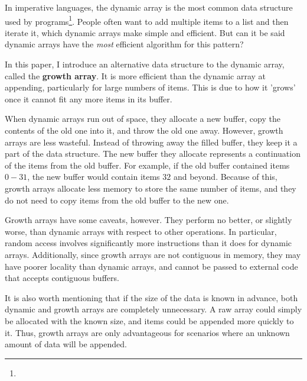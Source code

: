 In imperative languages, the dynamic array is the most common data structure used by programs\footnote{}. People often want to add multiple items to a list and then iterate it, which dynamic arrays make simple and efficient. But can it be said dynamic arrays have the \textit{most} efficient algorithm for this pattern?

In this paper, I introduce an alternative data structure to the dynamic array, called the \textbf{growth array}. It is more efficient than the dynamic array at appending, particularly for large numbers of items. This is due to how it 'grows' once it cannot fit any more items in its buffer.

When dynamic arrays run out of space, they allocate a new buffer, copy the contents of the old one into it, and throw the old one away. However, growth arrays are less wasteful. Instead of throwing away the filled buffer, they keep it a part of the data structure. The new buffer they allocate represents a continuation of the items from the old buffer. For example, if the old buffer contained items $0-31$, the new buffer would contain items $32$ and beyond. Because of this, growth arrays allocate less memory to store the same number of items, and they do not need to copy items from the old buffer to the new one.

Growth arrays have some caveats, however. They perform no better, or slightly worse, than dynamic arrays with respect to other operations. In particular, random access involves significantly more instructions than it does for dynamic arrays. Additionally, since growth arrays are not contiguous in memory, they may have poorer locality than dynamic arrays, and cannot be passed to external code that accepts contiguous buffers.

It is also worth mentioning that if the size of the data is known in advance, both dynamic and growth arrays are completely unnecessary. A raw array could simply be allocated with the known size, and items could be appended more quickly to it. Thus, growth arrays are only advantageous for scenarios where an unknown amount of data will be appended.